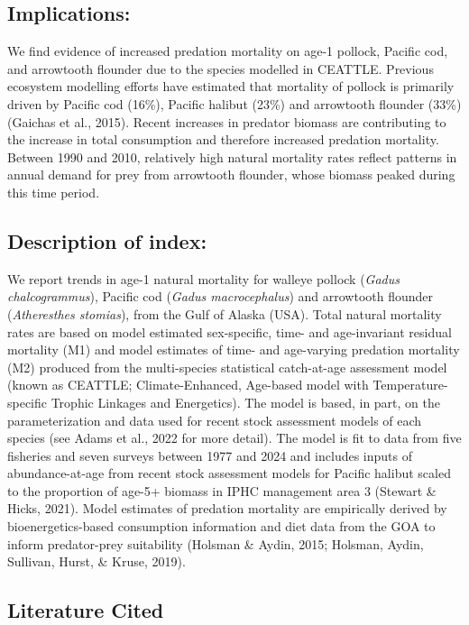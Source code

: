 \documentclass[
]{article}
\begin{document}
\subsection{Implications:}\label{implications}

We find evidence of increased predation mortality on age-1 pollock,
Pacific cod, and arrowtooth flounder due to the species modelled in
CEATTLE. Previous ecosystem modelling efforts have estimated that
mortality of pollock is primarily driven by Pacific cod (16\%), Pacific
halibut (23\%) and arrowtooth flounder (33\%)(Gaichas et al., 2015).
Recent increases in predator biomass are contributing to the increase in
total consumption and therefore increased predation mortality. Between
1990 and 2010, relatively high natural mortality rates reflect patterns
in annual demand for prey from arrowtooth flounder, whose biomass peaked
during this time period.

\subsection{Description of index:}\label{description-of-index}

We report trends in age-1 natural mortality for walleye pollock
(\emph{Gadus chalcogrammus}), Pacific cod (\emph{Gadus macrocephalus})
and arrowtooth flounder (\emph{Atheresthes stomias}), from the Gulf of
Alaska (USA). Total natural mortality rates are based on model estimated
sex-specific, time- and age-invariant residual mortality (M1) and model
estimates of time- and age-varying predation mortality (M2) produced
from the multi-species statistical catch-at-age assessment model (known
as CEATTLE; Climate-Enhanced, Age-based model with Temperature-specific
Trophic Linkages and Energetics). The model is based, in part, on the
parameterization and data used for recent stock assessment models of
each species (see Adams et al., 2022 for more detail). The model is fit
to data from five fisheries and seven surveys between 1977 and 2024 and
includes inputs of abundance-at-age from recent stock assessment models
for Pacific halibut scaled to the proportion of age-5+ biomass in IPHC
management area 3 (Stewart \& Hicks, 2021). Model estimates of predation
mortality are empirically derived by bioenergetics-based consumption
information and diet data from the GOA to inform predator-prey
suitability (Holsman \& Aydin, 2015; Holsman, Aydin, Sullivan, Hurst, \&
Kruse, 2019).

\subsection{Literature Cited}\label{literature-cited}
\end{document}
